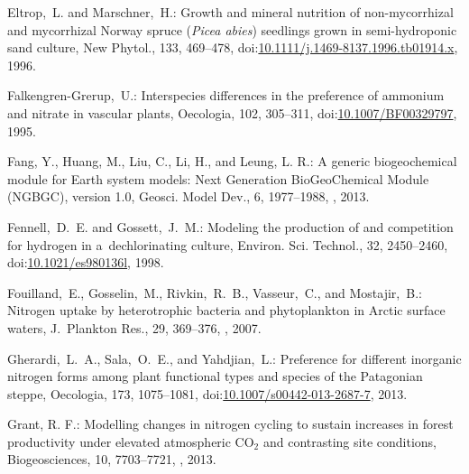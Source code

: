 \documentclass[gmd,noline]{copernicus}
\begin{document}
\begin{thebibliography}{55}
Eltrop,~L. and Marschner,~H.:
Growth and mineral nutrition of non-mycorrhizal and mycorrhizal Norway spruce (\textit{Picea abies}) seedlings grown in semi-hydroponic sand culture,
New Phytol.,
133, 469--478,
doi:\href{http://dx.doi.org/10.1111/j.1469-8137.1996.tb01914.x}{10.1111/j.1469-8137.1996.tb01914.x}, 1996.


Falkengren-Grerup,~U.:
Interspecies differences in the preference of ammonium and nitrate in vascular plants,
Oecologia,
102, 305--311,
doi:\href{http://dx.doi.org/10.1007/BF00329797}{10.1007/BF00329797}, 1995.




Fang, Y., Huang, M., Liu, C., Li, H., and Leung, L. R.: A generic
biogeochemical module for Earth system models: Next Generation BioGeoChemical
Module (NGBGC), version 1.0, Geosci. Model Dev., 6, 1977--1988,
, 2013.




Fennell,~D.~E. and Gossett,~J.~M.:
Modeling the production of and competition for hydrogen in a~dechlorinating culture,
Environ. Sci. Technol.,
32, 2450--2460,
doi:\href{http://dx.doi.org/10.1021/es980136l}{10.1021/es980136l}, 1998.


Fouilland,~E., Gosselin,~M., Rivkin,~R.~B., Vasseur,~C., and Mostajir,~B.:
Nitrogen uptake by heterotrophic bacteria and phytoplankton in Arctic surface
waters, J.~Plankton Res., 29, 369--376, , 2007.


Gherardi,~L.~A., Sala,~O.~E., and Yahdjian,~L.:
Preference for different inorganic nitrogen forms among plant functional types and species of the Patagonian steppe,
Oecologia,
173, 1075--1081,
doi:\href{http://dx.doi.org/10.1007/s00442-013-2687-7}{10.1007/s00442-013-2687-7}, 2013.



Grant, R. F.: Modelling changes in nitrogen cycling to sustain increases in
forest productivity under elevated atmospheric CO$_2$ and contrasting site
conditions, Biogeosciences, 10, 7703--7721, ,
2013.




\end{thebibliography}
\end{document}
